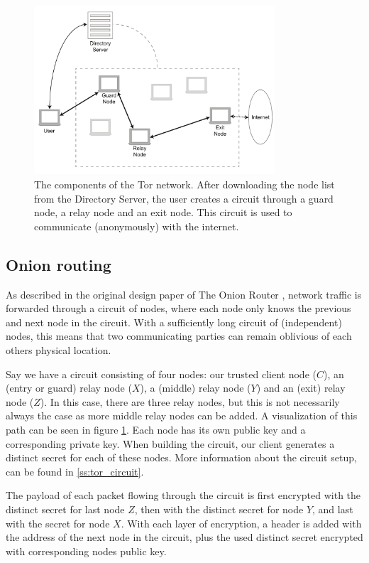 \documentclass{article}
\begin{document}
	\begin{figure}[!t]
		\centering
		\includegraphics[width=0.8\textwidth]{graphics/tor.pdf}
		\caption{The components of the Tor network. After downloading the node list from the Directory Server, the user creates a circuit through a guard node, a relay node and an exit node. This circuit is used to communicate (anonymously) with the internet.}
		\label{fig:tor_layout}
	\end{figure}

	\subsection{Onion routing}
		As described in the original design paper of The Onion Router \cite{goldschlag1996hiding}, network traffic is forwarded through a circuit of nodes, where each node only knows the previous and next node in the circuit. With a sufficiently long circuit of (independent) nodes, this means that two communicating parties can remain oblivious of each others physical location.
		
		Say we have a circuit consisting of four nodes: our trusted client node ($C$), an (entry or guard) relay node ($X$), a (middle) relay node ($Y$) and an (exit) relay node ($Z$). In this case, there are three relay nodes, but this is not necessarily always the case as more middle relay nodes can be added. A visualization of this path can be seen in figure \ref{fig:tor_layout}. Each node has its own public key and a corresponding private key. When building the circuit, our client generates a distinct secret for each of these nodes. More information about the circuit setup, can be found in \ref{ss:tor_circuit}.
		
		The payload of each packet flowing through the circuit is first encrypted with the distinct secret for last node $Z$, then with the distinct secret for node $Y$, and last with the secret for node $X$. With each layer of encryption, a header is added with the address of the next node in the circuit, plus the used distinct secret encrypted with corresponding nodes public key. 
		
\end{document}
